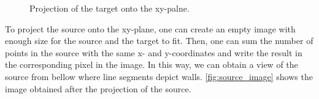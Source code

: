             \begin{figure}\centering
                \caption{Projection of the target onto the xy-palne.}
                \label{fig:target_image}
            \end{figure}

            To project the source onto the xy-plane, one can create an empty image with enough size for the source and the target to fit.
            Then, one can sum the number of points in the source with the same x- and y-coordinates and write the result in the corresponding pixel in the image.
            In this way, we can obtain a view of the source from bellow where line segments depict walls.
            \autoref{fig:source_image} shows the image obtained after the projection of the source.
            

